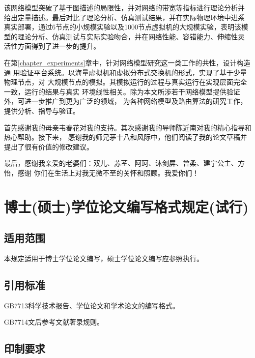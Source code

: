 \documentclass[master]{njuthesis}
\begin{document}
该网络模型突破了基于图描述的局限性，并对网络的带宽等指标进行理论分析并
给出定量描述。最后对比了理论分析、仿真测试结果，并在实际物理环境中进系
真实部署，通过6节点的小规模实验以及1000节点虚拟机的大规模实验，表明该模
型的理论分析、仿真测试与实际实验吻合，并在网络性能、容错能力、伸缩性灵
活性方面得到了进一步的提升。

在第\ref{chapter_experiments}章中，针对网络模型研究这一类工作的共性，设计构造通
用验证平台系统。以海量虚拟机和虚拟分布式交换机的形式，实现了基于少量物理节点，对
大规模节点的模拟。其模拟运行的过程与真实运行在实现层面完全一致，运行的结果与真实
环境线性相关。除为本文所涉若干网络模型提供验证外，可进一步推广到更为广泛的领域，
为各种网络模型及路由算法的研究工作，提供分析、指导与验证。

\begin{acknowledgement}
  首先感谢我的母亲韦春花对我的支持。其次感谢我的导师陈近南对我的精心指导和热心帮助。接下来，
  感谢我的师兄茅十八和风际中，他们阅读了我的论文草稿并提出了很有价值的修改建议。

  最后，感谢我亲爱的老婆们：双儿、苏荃、阿珂、沐剑屏、曾柔、建宁公主、方怡，感谢
  你们在生活上对我无微不至的关怀和照顾。我爱你们！
\end{acknowledgement}

\appendix

\chapter{博士(硕士)学位论文编写格式规定(试行)}

\section{适用范围}

本规定适用于博士学位论文编写，硕士学位论文编写应参照执行。

\section{引用标准}

GB7713科学技术报告、学位论文和学术论文的编写格式。

GB7714文后参考文献著录规则。

\section{印制要求}
\end{document}
